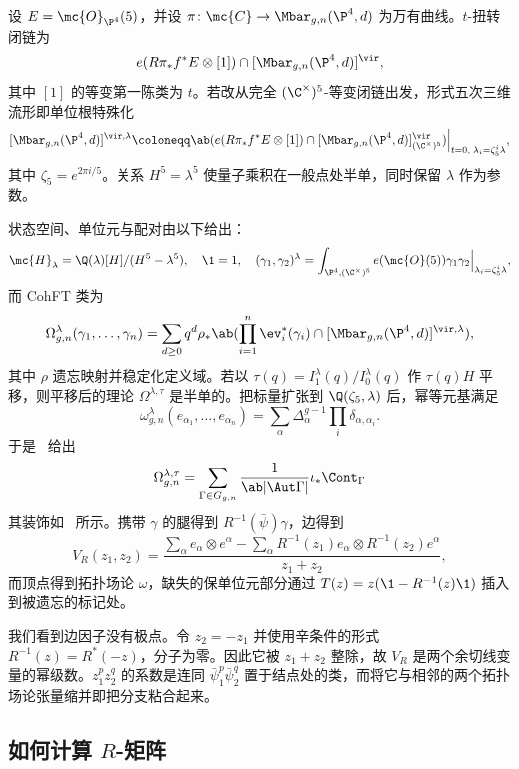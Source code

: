 设 \(E = \mc{O}_{\P^4}(5)\)，并设 \(\pi \colon \mc{C} \to \Mbar_{g,n}(\P^4,d)\) 为万有曲线。\(t\)-扭转闭链为
\[ e(R\pi_* f^* E \otimes [1]) \cap [\Mbar_{g,n}(\P^4,d)]^{\vir}, \]
其中 \([1]\) 的等变第一陈类为 \(t\)。若改从完全 \((\C^{\times})^5\)-等变闭链出发，形式五次三维流形即单位根特殊化
\[ [\Mbar_{g,n}(\P^4,d)]^{\vir,\lambda} \coloneqq \ab( e(R\pi_*f^*E \otimes [1]) \cap [\Mbar_{g,n}(\P^4,d)]^{\vir}_{(\C^{\times})^5})\Big|_{t=0, \; \lambda_i = \zeta_5^i \lambda}, \]
其中 \(\zeta_5 = e^{2\pi i/5}\)。关系 \(H^5 = \lambda^5\) 使量子乘积在一般点处半单，同时保留 \(\lambda\) 作为参数。

状态空间、单位元与配对由以下给出：
\[ \mc{H}_{\lambda} = \Q(\lambda)[H]/(H^5-\lambda^5), \quad \1 = 1, \quad (\gamma_1,\gamma_2)^{\lambda} = \int_{\P^4, (\C^{\times})^5} e(\mc{O}(5))\gamma_1\gamma_2 \Big|_{\lambda_i = \zeta_5^i\lambda}, \]
而 CohFT 类为
\[ \Omega^{\lambda}_{g,n}(\gamma_1, \ldots, \gamma_n) = \sum_{d \geq 0} q^d \rho_* \ab( \prod_{i=1}^n \ev_i^*(\gamma_i) \cap [\Mbar_{g,n}(\P^4,d)]^{\vir,\lambda}), \]
其中 \(\rho\) 遗忘映射并稳定化定义域。若以 \(\tau(q) = I^{\lambda}_1(q)/I^{\lambda}_0(q)\) 作 \(\tau(q)H\) 平移，则平移后的理论 \(\Omega^{\lambda,\tau}\) 是半单的。把标量扩张到 \(\Q(\zeta_5,\lambda)\) 后，幂等元基满足
\[ \omega^{\lambda}_{g,n}(e_{\alpha_1}, \ldots, e_{\alpha_n}) = \sum_{\alpha}\Delta_{\alpha}^{g-1}\prod_i \delta_{\alpha,\alpha_i}. \]
于是~ 给出
\[ \Omega^{\lambda,\tau}_{g,n} = \sum_{\Gamma \in G_{g,n}} \frac{1}{\ab|\Aut\Gamma|}\iota_* \Cont_{\Gamma} \]
其装饰如~ 所示。携带 \(\gamma\) 的腿得到 \(R^{-1}(\bar{\psi})\gamma\)，边得到
\[ V_R(z_1,z_2) = \frac{\sum_{\alpha} e_{\alpha}\otimes e^{\alpha} - \sum_{\alpha} R^{-1}(z_1)e_{\alpha} \otimes R^{-1}(z_2)e^{\alpha}}{z_1+z_2}, \]
而顶点得到拓扑场论 \(\omega\)，缺失的保单位元部分通过 \(T(z) = z(\1 - R^{-1}(z)\1)\) 插入到被遗忘的标记处。

\begin{rmk}
    我们看到边因子没有极点。令 \(z_2 = -z_1\) 并使用辛条件的形式 \(R^{-1}(z) = R^*(-z)\)，分子为零。因此它被 \(z_1+z_2\) 整除，故 \(V_R\) 是两个余切线变量的幂级数。\(z_1^p z_2^q\) 的系数是连同 \(\bar{\psi}_1^p \bar{\psi}_2^q\) 置于结点处的类，而将它与相邻的两个拓扑场论张量缩并即把分支粘合起来。
\end{rmk}

\subsection{如何计算 \(R\)-矩阵}%
\label{sub:How to compute the R-matrix (Guo)}

